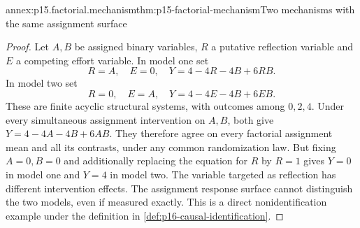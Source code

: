 \begin{annexitem}{annex:p15.factorial.mechanism}{thm:p15-factorial-mechanism}{Two mechanisms with the same assignment surface}
\begin{proof}
Let \(A,B\) be assigned binary variables, \(R\) a putative reflection
variable and \(E\) a competing effort variable. In model one set
\[
 R=A,\quad E=0,\quad Y=4-4R-4B+6RB.
\]
In model two set
\[
 R=0,\quad E=A,\quad Y=4-4E-4B+6EB.
\]
These are finite acyclic structural systems, with outcomes among
\(0,2,4\). Under every simultaneous assignment intervention on \(A,B\),
both give \(Y=4-4A-4B+6AB\). They therefore agree on every factorial
assignment mean and all its contrasts, under any common randomization law.
But fixing \(A=0,B=0\) and additionally replacing the equation for
\(R\) by \(R=1\) gives \(Y=0\) in model one and \(Y=4\) in model
two. The variable targeted as reflection has different intervention effects.
The assignment response surface cannot distinguish the two models, even
if measured exactly. This is a direct nonidentification example under the
definition in \cref{def:p16-causal-identification}.
\end{proof}
\end{annexitem}

